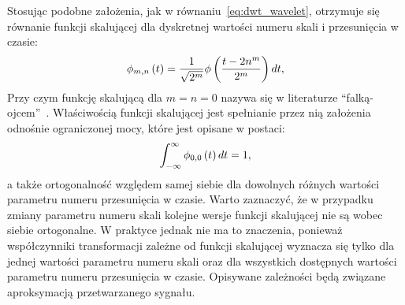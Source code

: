 Stosując podobne założenia, jak w równaniu~\eqref{eq:dwt_wavelet}, otrzymuje się równanie funkcji skalującej dla dyskretnej wartości numeru skali i przesunięcia w czasie:
\begin{equation}
\phi_{m,n} \left(t\right) = \frac{1}{\sqrt{2^{m}}} \phi \left(\frac{t-2n^{m}}{2^{m}}\right) dt \label{eq:dwt_scalefun},
\end{equation}
Przy czym funkcję skalującą dla $m = n = 0$ nazywa się w literaturze \enquote{falką-ojcem}~\cite{akujuobi_applications}. Właściwością funkcji skalującej jest spełnianie przez nią założenia odnośnie ograniczonej mocy, które jest opisane w postaci:
\begin{equation}
\int _{-\infty} ^{\infty} \phi_{0,0} \left(t\right) dt = 1 \label{eq:dwt_fatherwav},
\end{equation}
a także ortogonalność względem samej siebie dla dowolnych różnych wartości parametru numeru przesunięcia w czasie. Warto zaznaczyć, że w przypadku zmiany parametru numeru skali kolejne wersje funkcji skalującej nie są wobec siebie ortogonalne. W praktyce jednak nie ma to znaczenia, ponieważ współczynniki transformacji zależne od funkcji skalującej wyznacza się tylko dla jednej wartości parametru numeru skali oraz dla wszystkich dostępnych wartości parametru numeru przesunięcia w czasie. Opisywane zależności będą związane aproksymacją przetwarzanego sygnału.

